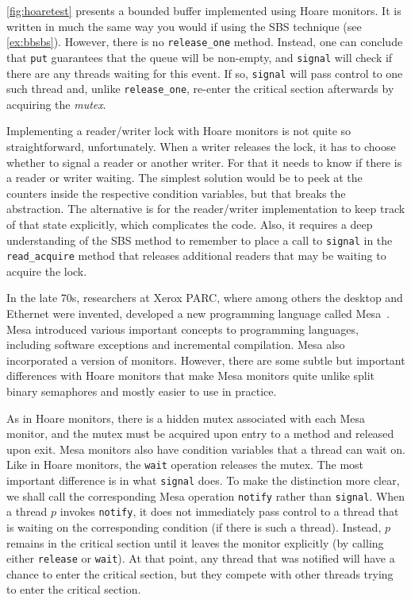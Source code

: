 \documentclass{report}
\begin{document}
\autoref{fig:hoaretest} presents a bounded buffer implemented using
Hoare monitors.
It is written in much the same way you would if using
the SBS technique (see \autoref{ex:bbsbs}).
However, there is no \texttt{release\_one} method.
Instead, one can conclude
that \texttt{put} guarantees that the queue will be non-empty, and
\texttt{signal} will check if there are any threads waiting for
this event.  If so, \texttt{signal} will pass control to one such thread
and, unlike \texttt{release\_one}, re-enter the critical
section afterwards by acquiring the \textit{mutex}.

Implementing a reader/writer lock with Hoare monitors is not quite so
straightforward, unfortunately.  When a writer releases the lock, it
has to choose whether to signal a reader or another writer.  For that
it needs to know if there is a reader or writer waiting.  The simplest
solution would be to peek at the counters inside the respective condition
variables, but that breaks the abstraction.  The alternative is for the
reader/writer implementation to keep track of that state explicitly,
which complicates the code.  Also, it requires a deep understanding of
the SBS method to remember to place a call to \texttt{signal} in the
\texttt{read\_acquire} method that releases additional readers that
may be waiting to acquire the lock.

In the late 70s, researchers at Xerox PARC,
where among others the desktop and Ethernet
were invented, developed a new programming language called
Mesa~\cite{LR80}.
%
Mesa introduced various important concepts to programming languages,
including software exceptions and incremental compilation.  Mesa also
incorporated a version of monitors.
However, there are some subtle but important differences with Hoare
monitors that make Mesa monitors quite unlike split binary semaphores
and mostly easier to use in practice.

As in Hoare monitors, there is a hidden mutex associated with each Mesa monitor,
and the mutex must be acquired upon entry to a method and released
upon exit.
Mesa monitors also have condition variables that a thread can wait on.
Like in Hoare monitors, the \texttt{wait} operation releases the mutex.
The most important difference is in what \texttt{signal} does.
To make the distinction more clear, we shall call the corresponding Mesa
operation \texttt{notify} rather than \texttt{signal}.
%
When a thread $p$ invokes \texttt{notify}, it does not immediately pass 
control to a thread that is waiting on the corresponding condition (if there
is such a thread).  Instead, $p$ remains in the critical section
until it leaves the monitor explicitly
(by calling either \texttt{release} or \texttt{wait}).
At that point, any thread that
was notified will have a chance to enter the critical section, but they compete
with other threads trying to enter the critical section.
\end{document}
